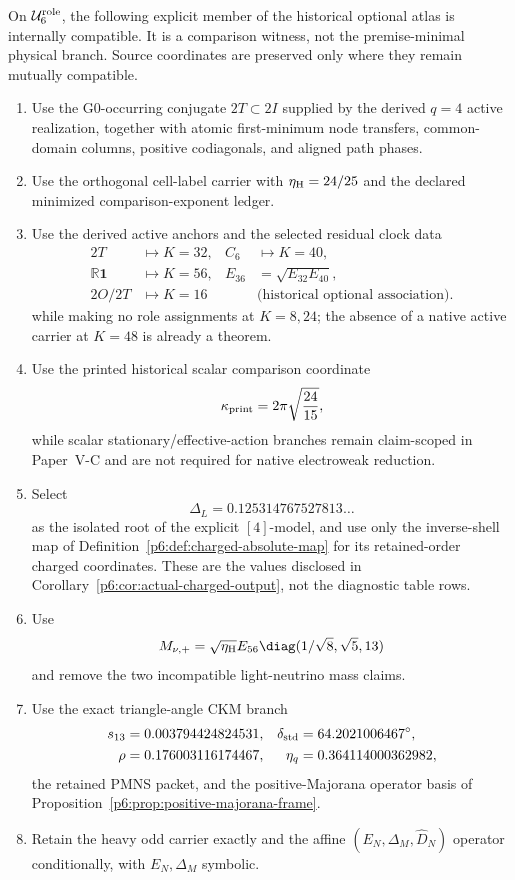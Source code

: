\documentclass[12pt,a4paper]{article}
\newcommand{\Urole}{\mathcal U_6^{\rm role}}
\newcommand{\etaH}{\eta_{\rm H}}
\begin{document}
\begin{proposition}
\label{p6:prop:selected-coherent-branch}
On \(\Urole\), the following explicit member of the historical optional atlas
is internally compatible.  It is a comparison witness, not the
premise-minimal physical branch.  Source coordinates are preserved only where
they remain mutually compatible.
\begin{enumerate}[leftmargin=2em]
\item Use the G0-occurring conjugate \(2T\subset2I\) supplied by the derived
\(q=4\) active realization, together with atomic first-minimum node transfers,
common-domain columns, positive codiagonals, and aligned path phases.
\item Use the orthogonal cell-label carrier with
\(\etaH=24/25\) and the declared minimized comparison-exponent ledger.
\item Use the derived active anchors and the selected residual clock data
\[
\begin{aligned}
2T&\mapsto K=32,& C_6&\mapsto K=40,\\
\mathbb R\mathbf1&\mapsto K=56,& E_{36}&=\sqrt{E_{32}E_{40}},\\
2O/2T&\mapsto K=16&&\text{(historical optional association)}.
\end{aligned}
\]
while making no role assignments at \(K=8,24\); the absence of a native
active carrier at \(K=48\) is already a theorem.
\item Use the printed historical scalar comparison coordinate
\[
\kappa_{\rm print}=2\pi\sqrt{\frac{24}{15}},
\]
while scalar stationary/effective-action branches remain claim-scoped in Paper~V-C and are not required for native electroweak reduction.
\item Select
\[
\Delta_L=0.125314767527813\ldots
\]
as the isolated root of the explicit \([4]\)-model, and use only the
inverse-shell map of Definition~\ref{p6:def:charged-absolute-map} for its
retained-order charged coordinates.  These are the values disclosed in
Corollary~\ref{p6:cor:actual-charged-output}, not the diagnostic table rows.
\item Use
\[
M_{\nu,+}
=
\sqrt{\etaH}E_{56}
\diag(1/\sqrt8,\sqrt5,13)
\]
and remove the two incompatible light-neutrino mass claims.
\item Use the exact triangle-angle CKM branch
\[
\begin{aligned}
s_{13}&=0.003794424824531,&
\delta_{\rm std}&=64.2021006467^\circ,\\
\rho&=0.176003116174467,&
\eta_q&=0.364114000362982,
\end{aligned}
\]
the retained PMNS packet, and the positive-Majorana operator basis of
Proposition~\ref{p6:prop:positive-majorana-frame}.
\item Retain the heavy odd carrier exactly and the affine
\((E_N,\Delta_M,\widehat D_N)\) operator conditionally, with
\(E_N,\Delta_M\) symbolic.
\end{enumerate}
\end{proposition}
\end{document}
